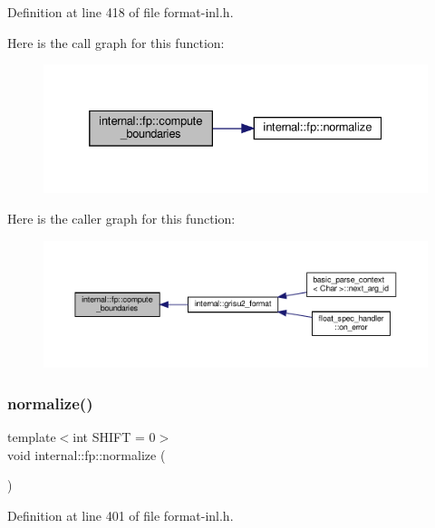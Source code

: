 Definition at line 418 of file format-\/inl.\+h.

Here is the call graph for this function\+:
\nopagebreak
\begin{figure}[H]
\begin{center}
\leavevmode
\includegraphics[width=332pt]{classinternal_1_1fp_ab235dc2ba165fadc8342cf2be3365a77_cgraph}
\end{center}
\end{figure}
Here is the caller graph for this function\+:
\nopagebreak
\begin{figure}[H]
\begin{center}
\leavevmode
\includegraphics[width=350pt]{classinternal_1_1fp_ab235dc2ba165fadc8342cf2be3365a77_icgraph}
\end{center}
\end{figure}
\mbox{\label{classinternal_1_1fp_ac3c688f71ca6decf9a608680dda8ff23}} 
\subsubsection{\texorpdfstring{normalize()}{normalize()}}
{\footnotesize\ttfamily template$<$int S\+H\+I\+FT = 0$>$ \\
void internal\+::fp\+::normalize (\begin{DoxyParamCaption}{ }\end{DoxyParamCaption})\hspace{0.3cm}{\ttfamily [inline]}}



Definition at line 401 of file format-\/inl.\+h.

